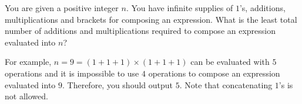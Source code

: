 You are given a positive integer $n$. 
You have infinite supplies of $1$'s, additions, multiplications and brackets for composing an expression. 
What is the least total number of additions and multiplications required to compose an expression evaluated into $n$?

For example, $n=9=(1+1+1)\times(1+1+1)$ can be evaluated with $5$ operations 
and it is impossible to use $4$ operations to compose an expression evaluated into $9$.
Therefore, you should output $5$.
Note that concatenating $1$'s is not allowed.
